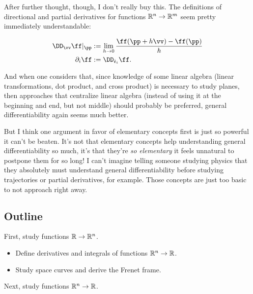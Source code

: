 After further thought, though, I don't really buy this. The definitions of directional and partial derivatives for functions $\mathbb{R}^n \rightarrow \mathbb{R}^m$ seem pretty immediately understandable:

\begin{align*}
    \DD_\vv \ff|_\pp &:= \lim_{h \rightarrow 0} \frac{\ff(\pp + h\vv) - \ff(\pp)}{h} \\
    \pd_i \ff &:= \DD_{\see_i} \ff.
\end{align*}

And when one considers that, since knowledge of some linear algebra (linear transformations, dot product, and cross product) is necessary to study planes, then approaches that centralize linear algebra (instead of using it at the beginning and end, but not middle) should probably be preferred, general differentiability again seems much better.

But I think one argument in favor of elementary concepts first is just so powerful it can't be beaten. It's not that elementary concepts help understanding general differentiability so much, it's that they're \textit{so elementary} it feels unnatural to postpone them for so long! I can't imagine telling someone studying physics that they absolutely must understand general differentiability before studying trajectories or partial derivatives, for example. Those concepts are just too basic to not approach right away.

\subsection*{Outline}

First, study functions $\mathbb{R} \rightarrow \mathbb{R}^n$.

\begin{itemize}
    \item Define derivatives and integrals of functions $\mathbb{R}^n \rightarrow \mathbb{R}$. 
    \item Study space curves and derive the Frenet frame.
\end{itemize}

Next, study functions $\mathbb{R}^n \rightarrow \mathbb{R}$.
    
